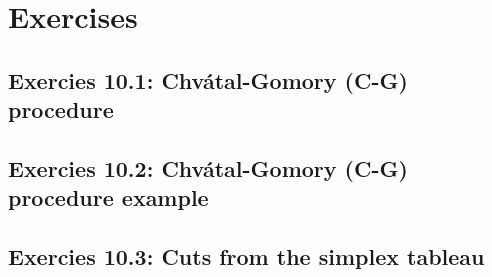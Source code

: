 \section{Exercises}

\subsection*{Exercies 10.1: Chv\'atal-Gomory (C-G) procedure}


\subsection*{Exercies 10.2: Chv\'atal-Gomory (C-G) procedure example}


\subsection*{Exercies 10.3: Cuts from the simplex tableau}






